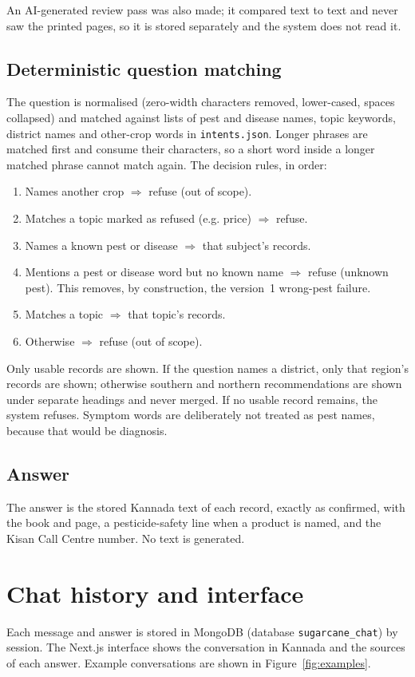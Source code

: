 An AI-generated review pass was also made; it compared text to text and never saw the
printed pages, so it is stored separately and the system does not read it.

\subsection{Deterministic question matching}
The question is normalised (zero-width characters removed, lower-cased, spaces collapsed)
and matched against lists of pest and disease names, topic keywords, district names and
other-crop words in \texttt{intents.json}. Longer phrases are matched first and consume
their characters, so a short word inside a longer matched phrase cannot match again. The
decision rules, in order:
\begin{enumerate}
  \item Names another crop $\Rightarrow$ refuse (out of scope).
  \item Matches a topic marked as refused (e.g. price) $\Rightarrow$ refuse.
  \item Names a known pest or disease $\Rightarrow$ that subject's records.
  \item Mentions a pest or disease word but no known name $\Rightarrow$ refuse
    (unknown pest). This removes, by construction, the version~1 wrong-pest failure.
  \item Matches a topic $\Rightarrow$ that topic's records.
  \item Otherwise $\Rightarrow$ refuse (out of scope).
\end{enumerate}
Only usable records are shown. If the question names a district, only that region's
records are shown; otherwise southern and northern recommendations are shown under
separate headings and never merged. If no usable record remains, the system refuses.
Symptom words are deliberately not treated as pest names, because that would be diagnosis.

\subsection{Answer}
The answer is the stored Kannada text of each record, exactly as confirmed, with the book
and page, a pesticide-safety line when a product is named, and the Kisan Call Centre
number. No text is generated.

\section{Chat history and interface}
Each message and answer is stored in MongoDB (database \texttt{sugarcane\_chat}) by
session. The Next.js interface shows the conversation in Kannada and the sources of each
answer. Example conversations are shown in Figure~\ref{fig:examples}.

